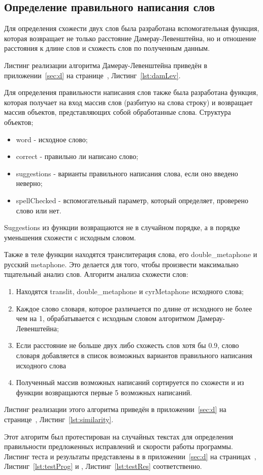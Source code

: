 \subsection{Определение правильного написания слов}

Для определения схожести двух слов была разработана вспомогательная функция, которая возвращает не только расстояние Дамерау-Левенштейна, но и отношение расстояния к длине слов и схожесть слов по полученным данным.

Листинг реализации алгоритма Дамерау-Левенштейна приведён в приложении~\ref{sec:d} на странице~\pageref{lst:damLev}, Листинг~\ref{lst:damLev}. 

Для определения правильности написания слов также была разработана функция, которая получает на вход массив слов (разбитую на слова строку) и возвращает массив объектов, представляющих собой обработанные слова. Структура объектов;

\begin{itemize}
  \item word - исходное слово;
  \item correct - правильно ли написано слово;
  \item suggestions - варианты правильного написания слова, если оно введено неверно;
  \item spellChecked - вспомогательный параметр, который определяет, проверено слово или нет.
\end{itemize}

Suggestions из функции возвращаются не в случайном порядке, а в порядке уменьшения схожести с исходным словом.

Также в теле функции находятся транслитерация слова, его double\_metaphone и русский metaphone. Это делается для того, чтобы произвести максимально тщательный анализ слов. Алгоритм анализа схожести слов:

\begin{enumerate}
  \item Находятся translit, double\_metaphone и cyrMetaphone исходного слова;
  \item Каждое слово словаря, которое различается по длине от исходного не более чем на 1, обрабатывается с исходным словом алгоритмом Дамерау-Левенштейна;
  \item Если расстояние не больше двух либо схожесть слов хотя бы 0.9, слово словаря добавляется в список возможных вариантов правильного написания исходного слова
  \item Полученный массив возможных написаний сортируется по схожести и из функции возвращаются первые 5 возможных написаний.
\end{enumerate}

Листинг реализации этого алгоритма приведён в приложении~\ref{sec:d} на странице~\pageref{lst:similarity}, Листинг~\ref{lst:similarity}.

Этот алгоритм был протестирован на случайных текстах для определения правильности предложенных исправлений и скорости работы программы. Листинг теста и результаты представлены в в приложении~\ref{sec:d} на страницах~\pageref{lst:testProg}, Листинг~\ref{lst:testProg} и \pageref{lst:testRes}, Листинг~\ref{lst:testRes} соответственно.